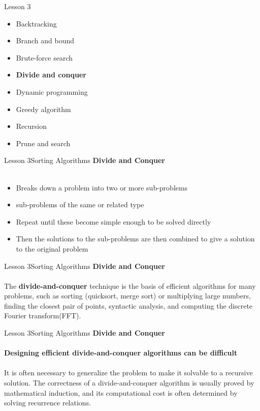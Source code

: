 \documentclass[aspectratio=1610]{beamer}
\begin{document}
\begin{frame}{Lesson 3}{}
\Large
\begin{itemize}
    \item Backtracking
    \item Branch and bound
    \item Brute-force search
    \item \textbf{Divide and conquer}
    \item Dynamic programming
    \item Greedy algorithm
    \item Recursion
    \item Prune and search
\end{itemize}
\end{frame}


\begin{frame}{Lesson 3}{Sorting Algorithms}
\LARGE
\textbf{Divide and Conquer}\\~\\
\Large
\begin{itemize}
	\item Breaks down a problem into two or more sub-problems 
	\item sub-problems of the same or related type
	\item Repeat until these become simple enough to be solved directly
	\item Then the solutions to the sub-problems are then combined to give a solution to the original problem
\end{itemize}
\end{frame}


\begin{frame}{Lesson 3}{Sorting Algorithms}
\LARGE
\textbf{Divide and Conquer}\\~\\
\Large
The \textbf{divide-and-conquer} technique is the basis of efficient algorithms for
many problems, such as sorting (quicksort, merge sort) or multiplying large numbers, 
finding the closest pair of points, syntactic analysis, and computing the discrete
Fourier transform(FFT).
\end{frame}


\begin{frame}{Lesson 3}{Sorting Algorithms}
\LARGE
\textbf{Divide and Conquer}\\~\\
\Large
\textbf{Designing efficient divide-and-conquer algorithms can be difficult}
\\~\\
It is often necessary to generalize the problem to make it solvable to a
\alert{recursive} solution. The correctness of a divide-and-conquer algorithm is
usually proved by mathematical induction, and its computational cost is often
determined by solving recurrence relations.
\end{frame}
\end{document}
